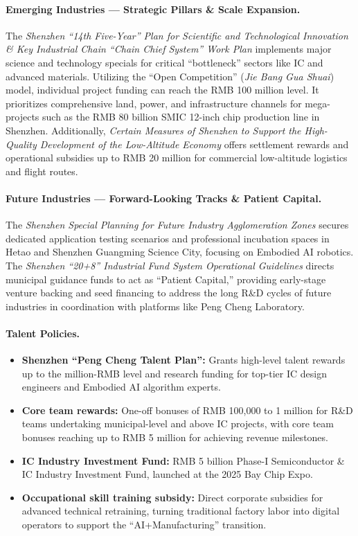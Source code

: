 \documentclass[12pt,a4paper]{article}
\begin{document}
\paragraph{Emerging Industries — Strategic Pillars \& Scale Expansion.}
The \textit{Shenzhen ``14th Five-Year'' Plan for Scientific and
Technological Innovation \& Key Industrial Chain ``Chain Chief System''
Work Plan} implements major science and technology specials for critical
``bottleneck'' sectors like IC and advanced materials. Utilizing the
``Open Competition'' (\textit{Jie Bang Gua Shuai}) model, individual
project funding can reach the RMB 100 million level. It prioritizes
comprehensive land, power, and infrastructure channels for mega-projects
such as the RMB 80 billion SMIC 12-inch chip production line in Shenzhen.
Additionally, \textit{Certain Measures of Shenzhen to Support the
High-Quality Development of the Low-Altitude Economy} offers settlement
rewards and operational subsidies up to RMB 20 million for commercial
low-altitude logistics and flight routes.

\paragraph{Future Industries — Forward-Looking Tracks \& Patient Capital.}
The \textit{Shenzhen Special Planning for Future Industry Agglomeration
Zones} secures dedicated application testing scenarios and professional
incubation spaces in Hetao and Shenzhen Guangming Science City, focusing
on Embodied AI robotics. The \textit{Shenzhen ``20+8'' Industrial Fund
System Operational Guidelines} directs municipal guidance funds to act as
``Patient Capital,'' providing early-stage venture backing and seed
financing to address the long R\&D cycles of future industries in
coordination with platforms like Peng Cheng Laboratory.

\paragraph{Talent Policies.}
\begin{itemize}
    \item \textbf{Shenzhen ``Peng Cheng Talent Plan'':} Grants high-level
          talent rewards up to the million-RMB level and research funding
          for top-tier IC design engineers and Embodied AI algorithm
          experts.
    \item \textbf{Core team rewards:} One-off bonuses of RMB 100,000 to
          1 million for R\&D teams undertaking municipal-level and above
          IC projects, with core team bonuses reaching up to RMB 5 million
          for achieving revenue milestones.
    \item \textbf{IC Industry Investment Fund:} RMB 5 billion Phase-I
          Semiconductor \& IC Industry Investment Fund, launched at the
          2025 Bay Chip Expo.
    \item \textbf{Occupational skill training subsidy:} Direct corporate
          subsidies for advanced technical retraining, turning traditional
          factory labor into digital operators to support the
          ``AI+Manufacturing'' transition.
\end{itemize}
\end{document}
